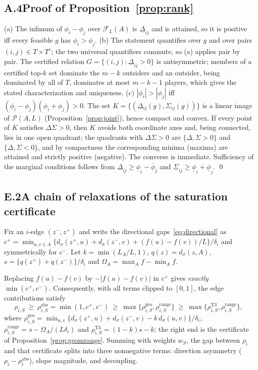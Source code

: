 \subsection*{A.4\quad Proof of Proposition~\ref{prop:rank}}
(a) The infimum of $\phi_i-\phi_j$ over $\mathcal F_L(A)$ is $\underline\Delta_{ij}$ and is attained, so it is positive iff
every feasible $g$ has $\phi_i>\phi_j$. (b) The statement quantifies over $g$ and over pairs $(i,j)\in T\times T^c$; the two
universal quantifiers commute, so (a) applies pair by pair. The certified relation $G=\{(i,j):\underline\Delta_{ij}>0\}$ is
antisymmetric; members of a certified top-$k$ set dominate the $m-k$ outsiders and an outsider, being dominated by all of
$T$, dominates at most $m-k-1$ players, which gives the stated characterization and uniqueness.
(c) $|\phi_i|>|\phi_j|$ iff $(\phi_i-\phi_j)(\phi_i+\phi_j)>0$. The set $K=\{(\Delta_{ij}(g),\Sigma_{ij}(g))\}$ is a linear image of
$\mathcal P(A,L)$ (Proposition~\ref{prop:joint}), hence compact and convex. If every point of $K$ satisfies
$\Delta\Sigma>0$, then $K$ avoids both coordinate axes and, being connected, lies in one open quadrant; the quadrants with
$\Delta\Sigma>0$ are $\{\Delta,\Sigma>0\}$ and $\{\Delta,\Sigma<0\}$, and by compactness the corresponding minima
(maxima) are attained and strictly positive (negative). The converse is immediate. Sufficiency of the marginal
conditions follows from $\underline\Delta_{ij}\ge\underline\phi_i-\overline\phi_j$ and $\underline\Sigma_{ij}\ge\underline\phi_i+\underline\phi_j$. \qed

\subsection*{E.2\quad A chain of relaxations of the saturation certificate}
Fix an $i$-edge $(z^-,z^+)$ and write the directional gaps~\eqref{eq:directional} as
$c^{+}=\min_{u,v\in A}\{d_\sigma(z^+,u)+d_\sigma(z^-,v)+(f(u)-f(v))/L\}/\delta_i$ and symmetrically for $c^-$.
Let $k=\min(L_A/L,1)$, $q(z)=d_\sigma(z,A)$, $s=\{q(z^+)+q(z^-)\}/\delta_i$ and $\Omega_A=\max_Af-\min_Af$.

\begin{proposition}\label{prop:chain}
Replacing $f(u)-f(v)$ by $-|f(u)-f(v)|$ in $c^+$ gives \emph{exactly} $\min(c^+,c^-)$. Consequently, with all terms clipped to
$[0,1]$, the edge contributions satisfy
\[
\rho_{i,S}\ \ge\ \rho^{\mathrm{abs}}_{i,S}=\min(1,c^+,c^-)\ \ge\ \max\{\rho^{\mathrm{geo}}_{i,S},\rho^{\mathrm{range}}_{i,S}\}\ \ge\
\max\{\rho^{\mathrm{T3}}_{i,S},\rho^{\mathrm{range}}_{i,S}\},
\]
where $\rho^{\mathrm{geo}}_{i,S}=\min_{u,v}\{d_\sigma(z^+,u)+d_\sigma(z^-,v)-k\,d_\sigma(u,v)\}/\delta_i$,
$\rho^{\mathrm{range}}_{i,S}=s-\Omega_A/(L\delta_i)$ and $\rho^{\mathrm{T3}}_{i,S}=(1-k)s-k$; the right end is the certificate of
Proposition~\ref{prop:geomrange}. Summing with weights $w_S$, the gap between $\rho_i$ and that certificate splits into three
nonnegative terms: direction asymmetry ($\rho_i-\rho_i^{\mathrm{abs}}$), slope magnitude, and decoupling.
\end{proposition}

